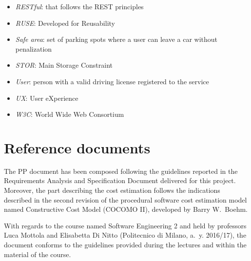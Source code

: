 \begin{itemize}
	\item \emph{RESTful}: that follows the REST principles
	\item \emph{RUSE}: Developed for Reusability
	\item \emph{Safe area}: set of parking spots where a user can leave a car without penalization 
	\item \emph{STOR}: Main Storage Constraint
	\item \emph{User}: person with a valid driving license registered to the service
	\item \emph{UX}: User eXperience
	\item \emph{W3C}: World Wide Web Consortium
\end{itemize}

\section{Reference documents}
The PP document has been composed following the guidelines reported in the Requirements Analysis and Specification Document delivered for this project. Moreover, the part describing the cost estimation follows the indications described in the second revision of the procedural software cost estimation model named Constructive Cost Model (COCOMO II), developed by Barry W.~Boehm.

With regards to the course named Software Engineering 2 and held by professors Luca Mottola and Elisabetta Di Nitto (Politecnico di Milano, a.~y. 2016/17), the document conforms to the guidelines provided during the lectures and within the material of the course.